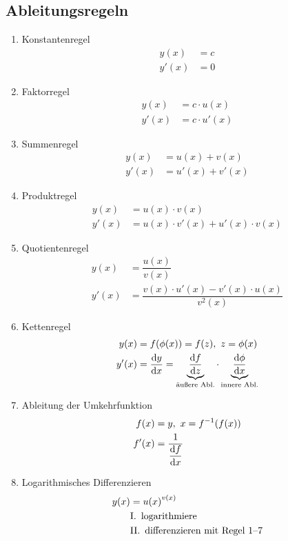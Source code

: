\subsection{Ableitungsregeln}

\begin{enumerate}
	\item Konstantenregel
	      \begin{align*}
		      y(x)  & = c \\
		      y'(x) & = 0
	      \end{align*}
	\item Faktorregel
	      \begin{align*}
		      y(x)  & = c \cdot u(x)  \\
		      y'(x) & = c \cdot u'(x)
	      \end{align*}
	\item Summenregel
	      \begin{align*}
		      y(x)  & = u(x) + v(x)   \\
		      y'(x) & = u'(x) + v'(x)
	      \end{align*}
	\item Produktregel
	      \begin{align*}
		      y(x)  & = u(x) \cdot v(x)                     \\
		      y'(x) & = u(x) \cdot v'(x) + u'(x) \cdot v(x)
	      \end{align*}
	\item Quotientenregel
	      \begin{align*}
		      y(x)  & = \dfrac{u(x)}{v(x)}                                  \\
		      y'(x) & = \dfrac{v(x) \cdot u'(x) - v'(x) \cdot u(x)}{v^2(x)}
	      \end{align*}
	\item Kettenregel
	      \begin{align*}
		      y(x)  & = f(\phi(x)) = f(z),\ z = \phi(x)                                                                                                                           \\
		      y'(x) & = \dfrac{\mathop{}\!\mathrm{d} y}{\mathop{}\!\mathrm{d} x} = \underbrace{\dfrac{\mathop{}\!\mathrm{d} f}{\mathop{}\!\mathrm{d} z}}_{\text{äußere Abl.}} \cdot \underbrace{\dfrac{\mathop{}\!\mathrm{d} \phi}{\mathop{}\!\mathrm{d} x}}_{\text{innere Abl.}}
	      \end{align*}
	\item Ableitung der Umkehrfunktion
	      \begin{align*}
		      f(x)  & = y,\ x = f^{-1}(f(x))                \\
		      f'(x) & = \dfrac{1}{\dfrac{\mathop{}\!\mathrm{d} f}{\mathop{}\!\mathrm{d} x}}
	      \end{align*}
	\item Logarithmisches Differenzieren
	      \begin{align*}
		      y(x) & = u{(x)}^{v(x)}                            \\
		           & \text{I.\, logarithmiere}                  \\
		           & \text{II.\, differenzieren mit Regel 1--7}
	      \end{align*}
\end{enumerate}
